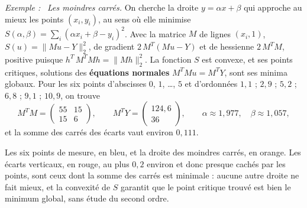 \documentclass[a4paper,twoside]{report}
\newcommand{\mot}[1]{\textcolor{rougecours}{\textbf{#1}}}
\newenvironment{exemple}%
 {\par\needspace{6\baselineskip}\vspace{1mm}\begin{list}{}{\leftmargin=1cm \rightmargin=0.5cm}\item[]%
  \textit{Exemple :}~}%
 {\end{list}\vspace{1mm}}
\newcommand{\tra}[1]{{#1}^{T}}                    %
\newcommand{\norme}[1]{\lVert #1 \rVert}         %
\begin{document}
\begin{exemple}
\emph{Les moindres carrés.} On cherche la droite $y = \alpha x + \beta$ qui approche au mieux les points $(x_{i}, y_{i})$, au sens où elle minimise $S(\alpha, \beta) = \displaystyle\sum_{i}(\alpha x_{i} + \beta - y_{i})^{2}$. Avec la matrice $M$ de lignes $(x_{i}, 1)$, $S(u) = \norme{Mu - Y}_{2}^{2}$, de gradient $2\,\tra{M}(Mu - Y)$ et de hessienne $2\,\tra{M}M$, positive puisque $\tra{h}\,\tra{M}Mh = \norme{Mh}_{2}^{2}$. La fonction $S$ est convexe, et ses points critiques, solutions des \mot{équations normales} $\tra{M}Mu = \tra{M}Y$, sont ses minima globaux. Pour les six points d'abscisses $0$, $1$, \dots, $5$ et d'ordonnées $1{,}1$ ; $2{,}9$ ; $5{,}2$ ; $6{,}8$ ; $9{,}1$ ; $10{,}9$, on trouve
\[ \tra{M}M = \begin{pmatrix} 55 & 15 \\ 15 & 6 \end{pmatrix}, \qquad \tra{M}Y = \begin{pmatrix} 124{,}6 \\ 36 \end{pmatrix}, \qquad \alpha \approx 1{,}977, \quad \beta \approx 1{,}057, \]
et la somme des carrés des écarts vaut environ $0{,}111$.
\end{exemple}

\begin{center}
\end{center}

\noindent Les six points de mesure, en bleu, et la droite des moindres carrés, en orange. Les écarts verticaux, en rouge, au plus $0{,}2$ environ et donc presque cachés par les points, sont ceux dont la somme des carrés est minimale : aucune autre droite ne fait mieux, et la convexité de $S$ garantit que le point critique trouvé est bien le minimum global, sans étude du second ordre.
\end{document}
